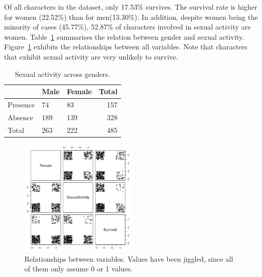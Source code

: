 \documentclass[10pt]{article}
\begin{document}
Of all characters in the dataset, only 17.53\% survives. The survival rate is higher for women (22.52\%) than for men(13.30\%). In addition, despite women being the minority of cases (45.77\%), 52.87\% of characters involved in sexual activity are women. Table~\ref{tab:sexXgender} summarises the relation between gender and sexual activity. Figure~\ref{fig:pairs} exhibits the relationships between all variables. Note that characters that exhibit sexual activity are very unlikely to survive.

\begin{table}[hbtp]
    \centering
    \footnotesize
    \caption{Sexual activity across genders.}
    \label{tab:sexXgender}
    \begin{tabularx}{\textwidth}{X X X r}
        \toprule
        & Male & Female & Total\\
        \midrule 
        Presence & 74 & 83 & 157 \\
        Absence & 189 & 139 & 328\\  
        Total & 263 & 222& 485\\  
        \bottomrule
       \end{tabularx}
\end{table}



\begin{figure}[hbtp]  
    \centering
    \includegraphics[width=0.5\textwidth]{media/pairs.png}
    \caption{Relationships between variables. Values have been jiggled, since all of them only assume 0 or 1 values.}
    \label{fig:pairs}
    \end{figure}
\end{document}
